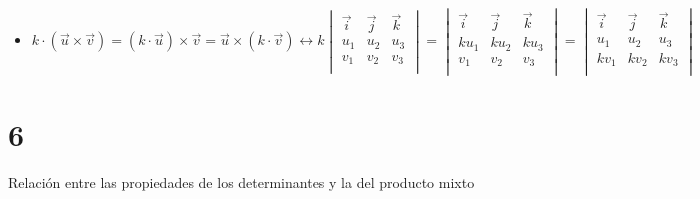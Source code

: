 \documentclass[
	12pt, %
	spanish, %
]{fphw}
\begin{document}
\begin{itemize}
	\item $k\cdot(\vec{u} \times \vec{v}) =( k \cdot \vec{u}) \times \vec{v}= \vec{u} \times (k \cdot\vec{v}) \leftrightarrow 
	k \begin{vmatrix}
		\vec{i} & \vec{j} & \vec{k} \\
		u_1 & u_2 & u_3\\
		v_1 & v_2 & v_3 \\
	\end{vmatrix} =  
	\begin{vmatrix}
		\vec{i} & \vec{j} & \vec{k} \\
		ku_1 & ku_2 & ku_3\\
		v_1 & v_2 & v_3 \\
	\end{vmatrix}=
	\begin{vmatrix}
		\vec{i} & \vec{j} & \vec{k} \\
		u_1 & u_2 & u_3\\
		kv_1 & kv_2 & kv_3 \\
	\end{vmatrix} $
	\\


\end{itemize}

\section*{6}
\begin{problem}
	Relación entre las propiedades de los determinantes y la del producto mixto
\end{problem}
\end{document}

